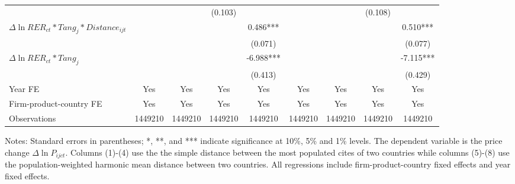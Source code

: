 \documentclass[12pt]{article}
\begin{document}
\begin{table}
{\begin{threeparttable}
\begin{tabular}{lcccccccc}
				&       &       & (0.103) &  &       &       & (0.108) &\\
				$\Delta \ln RER_{ct}*Tang_{j}*Distance_{ijt}$ &       &       &       & 0.486***
				&       &       &       & 0.510***\\
				&       &       &       & (0.071) &       &       &       & (0.077)\\
				$\Delta \ln RER_{ct}*Tang_{j}$ &       &       &       & -6.988*** &       &       &       & -7.115***\\
				&       &       &       & (0.413) &       &       &       & (0.429)\\
				Year FE  & Yes   & Yes   & Yes   & Yes & Yes   & Yes   & Yes   & Yes\\
				Firm-product-country FE & Yes   & Yes   & Yes   & Yes & Yes   & Yes   & Yes   & Yes\\
				Observations & 1449210 & 1449210 & 1449210 & 1449210 & 1449210 & 1449210 & 1449210 & 1449210\\
				\bottomrule
			\end{tabular}
			\begin{tablenotes}
				\footnotesize
				\item[Notes:] Standard errors in parentheses; *, **, and *** indicate significance at 10\%, 5\% and 1\% levels. The dependent variable is the price change $\Delta \ln P_{ijct}$. Columns (1)-(4) use the the simple distance between the most populated cites of two countries while columns (5)-(8) use the population-weighted harmonic mean distance between two countries. All regressions include firm-product-country fixed effects and year fixed effects.
			\end{tablenotes}
		\end{threeparttable}
	}
	\label{tab.source.distance}
\end{table}
\end{document}
